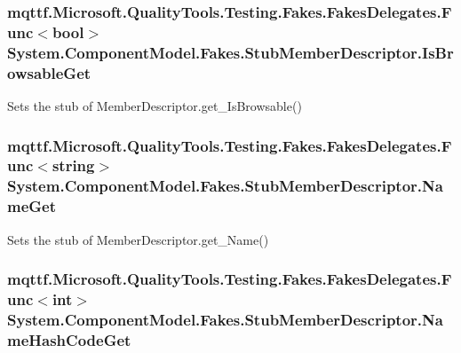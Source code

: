 \hypertarget{class_system_1_1_component_model_1_1_fakes_1_1_stub_member_descriptor_ae1418792897ffea8be5a6165e362323e}{
\subsubsection[{Is\-Browsable\-Get}]{\setlength{\rightskip}{0pt plus 5cm}mqttf.\-Microsoft.\-Quality\-Tools.\-Testing.\-Fakes.\-Fakes\-Delegates.\-Func$<$bool$>$ System.\-Component\-Model.\-Fakes.\-Stub\-Member\-Descriptor.\-Is\-Browsable\-Get}}\label{class_system_1_1_component_model_1_1_fakes_1_1_stub_member_descriptor_ae1418792897ffea8be5a6165e362323e}


Sets the stub of Member\-Descriptor.\-get\-\_\-\-Is\-Browsable()

\hypertarget{class_system_1_1_component_model_1_1_fakes_1_1_stub_member_descriptor_a022c471ebd7d2d2bf6cb9883d4eca7f1}{
\subsubsection[{Name\-Get}]{\setlength{\rightskip}{0pt plus 5cm}mqttf.\-Microsoft.\-Quality\-Tools.\-Testing.\-Fakes.\-Fakes\-Delegates.\-Func$<$string$>$ System.\-Component\-Model.\-Fakes.\-Stub\-Member\-Descriptor.\-Name\-Get}}\label{class_system_1_1_component_model_1_1_fakes_1_1_stub_member_descriptor_a022c471ebd7d2d2bf6cb9883d4eca7f1}


Sets the stub of Member\-Descriptor.\-get\-\_\-\-Name()

\hypertarget{class_system_1_1_component_model_1_1_fakes_1_1_stub_member_descriptor_affed3480e2a86f0eaa3ee6dcd40e7644}{
\subsubsection[{Name\-Hash\-Code\-Get}]{\setlength{\rightskip}{0pt plus 5cm}mqttf.\-Microsoft.\-Quality\-Tools.\-Testing.\-Fakes.\-Fakes\-Delegates.\-Func$<$int$>$ System.\-Component\-Model.\-Fakes.\-Stub\-Member\-Descriptor.\-Name\-Hash\-Code\-Get}}\label{class_system_1_1_component_model_1_1_fakes_1_1_stub_member_descriptor_affed3480e2a86f0eaa3ee6dcd40e7644}


